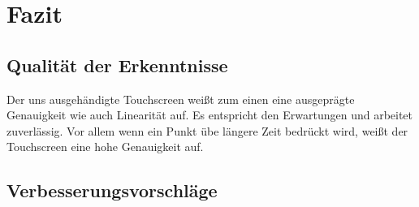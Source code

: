 \chapter{Fazit}
\section{Qualität der Erkenntnisse}
Der uns ausgehändigte Touchscreen weißt zum einen eine ausgeprägte Genauigkeit wie auch Linearität auf. Es entspricht den Erwartungen und arbeitet zuverlässig.
Vor allem wenn ein Punkt übe längere Zeit bedrückt wird, weißt der Touchscreen eine hohe Genauigkeit auf. 
\section{Verbesserungsvorschläge}